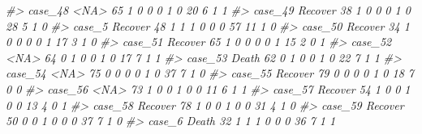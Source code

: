 \documentclass[]{book}
\newenvironment{Shaded}{\begin{snugshade}}{\end{snugshade}}
\newcommand{\CommentTok}[1]{\textcolor[rgb]{0.56,0.35,0.01}{\textit{#1}}}
\begin{document}
\begin{Shaded}
\begin{Highlighting}[]
\CommentTok{#> case_48     <NA>  65        1        0                0                 0                 1              0                    20                      6           1             1}
\CommentTok{#> case_49  Recover  38        1        0                0                 0                 1              0                    28                      5           1             0}
\CommentTok{#> case_5   Recover  48        1        1                1                 0                 0              0                    57                     11           1             0}
\CommentTok{#> case_50  Recover  34        1        0                0                 0                 0              1                    17                      3           1             0}
\CommentTok{#> case_51  Recover  65        1        0                0                 0                 0              1                    15                      2           0             1}
\CommentTok{#> case_52     <NA>  64        0        1                0                 0                 1              0                    17                      7           1             1}
\CommentTok{#> case_53    Death  62        0        1                0                 0                 1              0                    22                      7           1             1}
\CommentTok{#> case_54     <NA>  75        0        0                0                 0                 1              0                    37                      7           1             0}
\CommentTok{#> case_55  Recover  79        0        0                0                 0                 1              0                    18                      7           0             0}
\CommentTok{#> case_56     <NA>  73        1        0                0                 1                 0              0                    11                      6           1             1}
\CommentTok{#> case_57  Recover  54        1        0                0                 1                 0              0                    13                      4           0             1}
\CommentTok{#> case_58  Recover  78        1        0                0                 1                 0              0                    31                      4           1             0}
\CommentTok{#> case_59  Recover  50        0        0                1                 0                 0              0                    37                      7           1             0}
\CommentTok{#> case_6     Death  32        1        1                1                 0                 0              0                    36                      7           1             1}

\end{Highlighting}
\end{Shaded}
\end{document}
